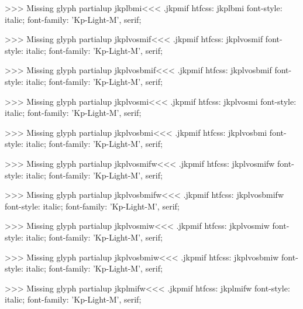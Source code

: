 >>>
Missing glyph	partialup
\<jkplbmi\><<<
.jkpmif
htfcss:  jkplbmi  font-style: italic; font-family: 'Kp-Light-M', serif;

>>>
Missing glyph	partialup
\<jkplvosmif\><<<
.jkpmif
htfcss:  jkplvosmif  font-style: italic; font-family: 'Kp-Light-M', serif;

>>>
Missing glyph	partialup
\<jkplvosbmif\><<<
.jkpmif
htfcss:  jkplvosbmif  font-style: italic; font-family: 'Kp-Light-M', serif;

>>>
Missing glyph	partialup
\<jkplvosmi\><<<
.jkpmif
htfcss:  jkplvosmi  font-style: italic; font-family: 'Kp-Light-M', serif;

>>>
Missing glyph	partialup
\<jkplvosbmi\><<<
.jkpmif
htfcss:  jkplvosbmi  font-style: italic; font-family: 'Kp-Light-M', serif;

>>>
Missing glyph	partialup
\<jkplvosmifw\><<<
.jkpmif
htfcss:  jkplvosmifw  font-style: italic; font-family: 'Kp-Light-M', serif;

>>>
Missing glyph	partialup
\<jkplvosbmifw\><<<
.jkpmif
htfcss:  jkplvosbmifw  font-style: italic; font-family: 'Kp-Light-M', serif;

>>>
Missing glyph	partialup
\<jkplvosmiw\><<<
.jkpmif
htfcss:  jkplvosmiw  font-style: italic; font-family: 'Kp-Light-M', serif;

>>>
Missing glyph	partialup
\<jkplvosbmiw\><<<
.jkpmif
htfcss:  jkplvosbmiw  font-style: italic; font-family: 'Kp-Light-M', serif;

>>>
Missing glyph	partialup
\<jkplmifw\><<<
.jkpmif
htfcss:  jkplmifw  font-style: italic; font-family: 'Kp-Light-M', serif;

